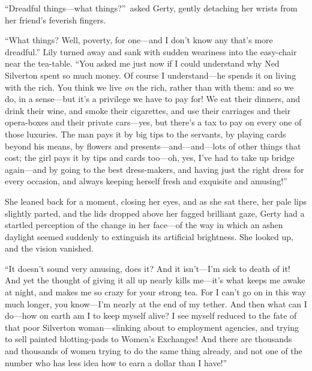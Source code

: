 \documentclass[12pt,a4paper]{book}
\begin{document}
``Dreadful things---what things?''\ asked Gerty, gently detaching her
wrists from her friend's feverish fingers.





``What things? Well, poverty, for one---and I don't know any that's
more dreadful.'' Lily turned away and sank with sudden weariness
into the easy-chair near the tea-table. ``You asked me just now if
I could understand why Ned Silverton spent so much money. Of
course I understand---he spends it on living with the rich. You
think we live \textit{on} the rich, rather than with them: and so we do,
in a sense---but it's a privilege we have to pay for! We eat their
dinners, and drink their wine, and smoke their cigarettes, and use
their carriages and their opera-boxes and their private cars---yes,
but there's a tax to pay on every one of those luxuries. The man
pays it by big tips to the servants, by playing cards beyond his
means, by flowers and presents---and---and---lots of other things
that cost; the girl pays it by tips and cards too---oh, yes, I've
had to take up bridge again---and by going to the best dress-makers,
and having just the right dress for every occasion, and always
keeping herself fresh and exquisite and amusing!''





She leaned back for a moment, closing her eyes, and as she sat
there, her pale lips slightly parted, and the lids dropped above
her fagged brilliant gaze, Gerty had a startled perception of the
change in her face---of the way in which an ashen daylight seemed
suddenly to extinguish its artificial brightness. She looked up,
and the vision vanished.





``It doesn't sound very amusing, does it? And it isn't---I'm sick
to death of it! And yet the thought of giving it all up nearly
kills me---it's what keeps me awake at night, and makes me so
crazy for your strong tea. For I can't go on in this way much
longer, you know---I'm nearly at the end of my tether. And then
what can I do---how on earth am I to keep myself alive? I see
myself reduced to the fate of that poor Silverton woman---slinking
about to employment agencies, and trying to sell painted
blotting-pads to Women's Exchanges! And there are thousands and
thousands of women trying to do the same thing already, and not
one of the number who has less idea how to earn a dollar than I
have!''
\end{document}
